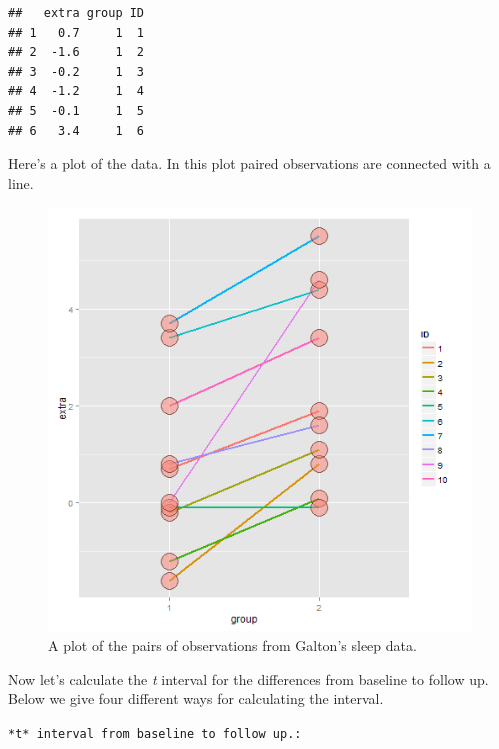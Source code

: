 \documentclass[]{article}
\begin{document}
\begin{verbatim}
##   extra group ID
## 1   0.7     1  1
## 2  -1.6     1  2
## 3  -0.2     1  3
## 4  -1.2     1  4
## 5  -0.1     1  5
## 6   3.4     1  6
\end{verbatim}

Here's a plot of the data. In this plot paired observations are
connected with a line.

\begin{figure}[htbp]
\centering
\includegraphics{LeanPub/images/galtonSleep-1.png}
\caption{A plot of the pairs of observations from Galton's sleep data.}
\end{figure}

Now let's calculate the \emph{t} interval for the differences from
baseline to follow up. Below we give four different ways for calculating
the interval.

\vspace{1pc}

\verb;*t* interval from baseline to follow up.:;
\end{document}
